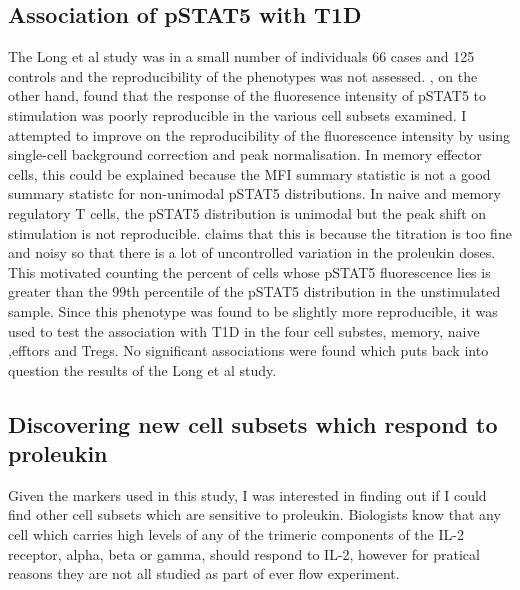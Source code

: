 \subsection{Association of pSTAT5 with T1D}

The Long et al study was in a small number of individuals 66 cases and 125 controls and the reproducibility of the phenotypes was not assessed.
, on the other hand, found that the response of the fluoresence intensity of pSTAT5 to stimulation was poorly reproducible in the various cell subsets
examined.  I attempted to improve on the reproducibility of the fluorescence intensity by using single-cell background correction and peak normalisation.
In memory effector cells, this could be explained because the MFI summary statistic is not a good summary statistc for non-unimodal pSTAT5 distributions.
In naive and memory regulatory T cells, the pSTAT5 distribution is unimodal but the peak shift on stimulation is not reproducible.
 claims that this is because the titration is too fine and noisy so that there is a lot of uncontrolled variation in the proleukin doses.
This motivated counting the percent of cells whose pSTAT5 fluorescence lies is greater than the 99th percentile of the pSTAT5 distribution in the unstimulated sample.
Since this phenotype was found to be slightly more reproducible, it was used to test the association with T1D in the four cell substes, memory, naive ,efftors and Tregs.
No significant associations were found which puts back into question the results of the Long et al study.

\subsection{Discovering new cell subsets which respond to proleukin}

Given the markers used in this study, I was interested in finding out if I could find other cell subsets which are sensitive to proleukin.
Biologists know that any cell which carries high levels of any of the trimeric components of the IL-2 receptor, alpha, beta or gamma,
should respond to IL-2, however for pratical reasons they are not all studied as part of ever flow experiment.






